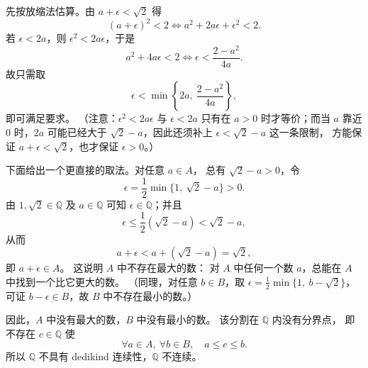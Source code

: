 \documentclass[UTF8,11pt]{ctexart}
\theoremstyle{cnthm}
\begin{document}
先按放缩法估算。由 $a+\epsilon<\sqrt2$ 得
\[
(a+\epsilon)^2<2
\iff a^2+2a\epsilon+\epsilon^2<2.
\]
若 $\epsilon<2a$，则 $\epsilon^2<2a\epsilon$，于是
\[
a^2+4a\epsilon<2
\iff \epsilon<\frac{2-a^2}{4a}.
\]
故只需取
\[
\epsilon<\min\left\{2a,\ \frac{2-a^2}{4a}\right\},
\]
即可满足要求。
（注意：$\epsilon^2<2a\epsilon$ 与 $\epsilon<2a$ 只有在
$a>0$ 时才等价；而当 $a$ 靠近 $0$ 时，$2a$ 可能已经大于
$\sqrt2-a$，因此还须补上 $\epsilon<\sqrt2-a$ 这一条限制，
方能保证 $a+\epsilon<\sqrt2$，也才保证 $\epsilon>0$。）

下面给出一个更直接的取法。对任意 $a\in A$，
总有 $\sqrt2-a>0$，令
\[
\epsilon=\frac12\min\{1,\ \sqrt2-a\}>0 .
\]
由 $1,\sqrt2\in\mathbb Q$ 及 $a\in\mathbb Q$ 可知
$\epsilon\in\mathbb Q$；并且
\[
\epsilon\leq\frac12(\sqrt2-a)<\sqrt2-a,
\]
从而
\[
a+\epsilon<a+(\sqrt2-a)=\sqrt2,
\]
即 $a+\epsilon\in A$。
这说明 $A$ 中不存在最大的数：
对 $A$ 中任何一个数 $a$，总能在 $A$ 中找到一个比它更大的数。
（同理，对任意 $b\in B$，取
$\epsilon=\frac12\min\{1,\ b-\sqrt2\}$，
可证 $b-\epsilon\in B$，故 $B$ 中不存在最小的数。）

因此，$A$ 中没有最大的数，$B$ 中没有最小的数。
该分割在 $\mathbb Q$ 内没有分界点，
即不存在 $c\in\mathbb Q$ 使
\[
\forall a\in A,\ \forall b\in B,\quad a\leq c\leq b.
\]
所以 $\mathbb Q$ 不具有 dedikind 连续性，$\mathbb Q$ 不连续。
\end{document}
